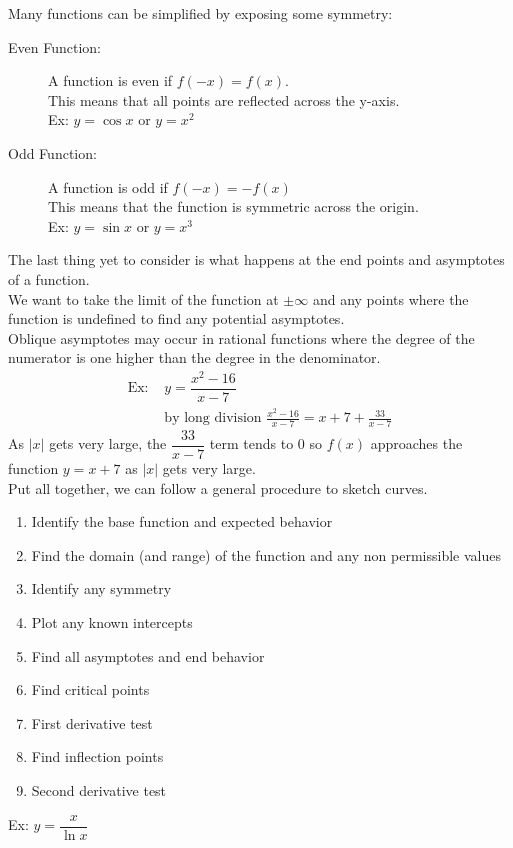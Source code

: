 \documentclass[11pt, fleqn]{article}
\begin{document}
Many functions can be simplified by exposing some symmetry:
\begin{description}
    \item[Even Function:] A function is even if $f(-x)=f(x)$.\\
    This means that all points are reflected across the y-axis.\\
    Ex: $y=\cos x$ or $y=x^2$
    \item[Odd Function:] A function is odd if $f(-x)=-f(x)$\\
    This means that the function is symmetric across the origin.\\
    Ex: $y=\sin x$ or $y=x^3$
\end{description}
The last thing yet to consider is what happens at the end points and asymptotes of a function.\\
We want to take the limit of the function at $\pm\infty$ and any points where the function is undefined to find any potential asymptotes.\\
Oblique asymptotes may occur in rational functions where the degree of the numerator is one higher than the degree in the denominator.
\begin{align*}
    \text{Ex: }&y=\dfrac{x^2-16}{x-7}\\
    &\text{by long division }\frac{x^2-16}{x-7}=x+7+\frac{33}{x-7}
\end{align*}
As $|x|$ gets very large, the $\dfrac{33}{x-7}$ term tends to 0 so $f(x)$ approaches the function $y=x+7$ as $|x|$ gets very large.\\
Put all together, we can follow a general procedure to sketch curves.
\begin{enumerate}
    \item Identify the base function and expected behavior
    \item Find the domain (and range) of the function and any non permissible values
    \item Identify any symmetry
    \item Plot any known intercepts
    \item Find all asymptotes and end behavior
    \item Find critical points
    \item First derivative test
    \item Find inflection points
    \item Second derivative test
\end{enumerate}
Ex: $y=\dfrac{x}{\ln x}$\\
\end{document}
